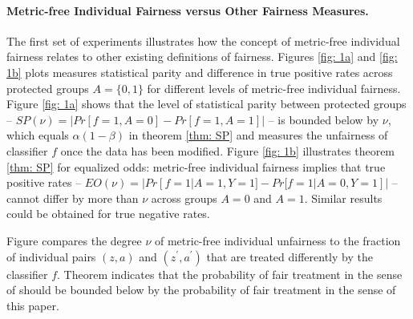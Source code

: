 \documentclass{article}
\begin{document}
\paragraph{Metric-free Individual Fairness versus Other Fairness Measures.}
The first set of experiments illustrates how the concept of metric-free individual fairness relates to other existing definitions of fairness. Figures \ref{fig: 1a} and \ref{fig: 1b} plots measures statistical parity and  difference in true positive rates across protected groups $A=\{0, 1\}$ for different levels of metric-free individual fairness. Figure \ref{fig: 1a} shows that the level of statistical parity between protected groups -- $SP(\nu)=|Pr[f=1, A=0] - Pr[f=1, A=1]|$ -- is bounded below by $\nu$, which equals $\alpha(1-\beta)$ in theorem \ref{thm: SP} and measures the unfairness of classifier $f$ once the data has been modified. Figure \ref{fig: 1b} illustrates theorem \ref{thm: SP} for equalized odds: metric-free individual fairness implies that true positive rates -- $EO(\nu)= |Pr[f=1|A=1, Y=1] - Pr[f=1|A=0, Y=1]|$ -- cannot differ by more than $\nu$ across groups $A=0$ and $A=1$. Similar results could be obtained for true negative rates.

\bigskip
Figure compares the degree $\nu$ of metric-free individual unfairness to the fraction of individual pairs $(z, a)$ and $(z^{'}, a^{'})$ that are treated differently by the classifier $f$. Theorem indicates that the probability of fair treatment in the sense of \cite{dwork2012fairness} should be bounded below by the probability of fair treatment in the sense of this paper. 
\end{document}
